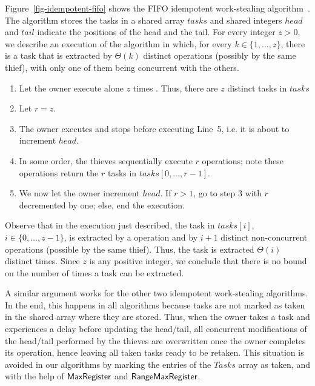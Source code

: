 Figure~\ref{fig-idempotent-fifo} shows the FIFO idempotent work-stealing algorithm~\cite{maged.vechev.2009}. The algorithm stores the tasks in a shared array $tasks$ and shared integers $head$ and $tail$ indicate the positions of the head and the tail.  For every integer $z > 0$, we describe an execution of the algorithm in which, for every $k \in \{1, \hdots, z\}$, there is a task that is extracted by $\Theta(k)$ distinct operations (possibly by the same thief), with only one of them being concurrent with the others.

\begin{enumerate}

\item Let the owner execute alone $z$ times \Put. Thus, there are $z$ distinct tasks in $tasks$

\item Let $r = z$.

\item The owner executes \Take and stops before executing Line~5, i.e.  it is about to increment $head$.

\item In some order, the thieves sequentially execute $r$ \Steal operations; note these \Steal operations return the $r$ tasks in $tasks[0, \hdots, r-1]$.

\item We now let the owner increment $head$. If $r > 1$, go to step 3 with $r$ decremented by one; else, end the execution.
\end{enumerate}

Observe that in the execution just described, the task in $tasks[i]$, $i \in \{0, \hdots, z-1\}$, is extracted by a \Take operation and by $i+1$ distinct non-concurrent \Steal operations (possible by the same thief).  Thus, the task is extracted $\Theta(i)$ distinct times.  Since $z$ is any positive integer, we conclude that there is no bound on the number of times a task can be extracted.

A similar argument works for the other two idempotent work-stealing algorithms.  In the end, this happens in all algorithms because tasks are not marked as taken in the shared array where they are stored. Thus, when the owner takes a task and experiences a delay before updating the head/tail, all concurrent modifications of the head/tail performed by the thieves are overwritten once the owner completes its operation, hence leaving all taken tasks ready to be retaken.  This situation is avoided in our algorithms by marking the entries of the $Tasks$ array as taken, and with the help of ${\sf \small MaxRegister}$ and ${\sf \small RangeMaxRegister}$.


